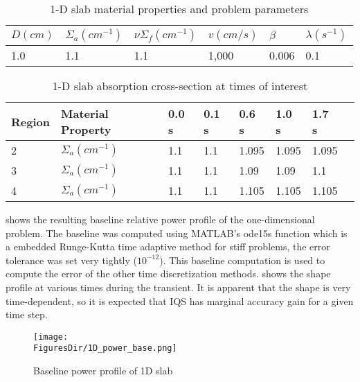 \begin{table}[!htbp]
\begin{center}
\caption{1-D slab material properties and problem parameters}
\label{tab:1Dmat}
\begin{tabular}{llllll}
\hline
$D (cm)$ & $\Sigma_a (cm^{-1})$ & $\nu \Sigma_f (cm^{-1})$ & $v (cm/s)$ & $\beta$ & $\lambda (s^{-1})$ \\
\hline
1.0 & 1.1 & 1.1 & 1,000 & 0.006 & 0.1 \\

\hline
\end{tabular}
\end{center}
\end{table}

\begin{table}[!htbp]
\begin{center}
\caption{1-D slab absorption cross-section at times of interest}
\label{tab:1Dslope}
\begin{tabular}{llllllll}
\hline
Region & Material Property & 0.0 s & 0.1 s & 0.6 s & 1.0 s & 1.7 s \\
\hline
2 & $\Sigma_{a} (cm^{-1})$ & 1.1 & 1.1 & 1.095 & 1.095 & 1.095 \\
3 & $\Sigma_{a} (cm^{-1})$ & 1.1 & 1.1 & 1.09 & 1.09 & 1.1 \\
4 & $\Sigma_{a} (cm^{-1})$ & 1.1 & 1.1 & 1.105 & 1.105 & 1.105 \\
\hline
\end{tabular}
\end{center}
\end{table}

 shows the resulting baseline relative power profile of the one-dimensional problem.  The baseline was computed using MATLAB's ode15s function which is a embedded Runge-Kutta time adaptive method for stiff problems, the error tolerance was set very tightly ($10^{-12}$).  This baseline computation is used to compute the error of the other time discretization methods.   shows the shape profile at various times during the transient.  It is apparent that the shape is very time-dependent, so it is expected that IQS has marginal accuracy gain for a given time step.

\begin{figure}[!htbp]
\begin{center}
\texttt{[image: \\FiguresDir/1D\_power\_base.png]}
\caption{Baseline power profile of 1D slab}
\label{fig:1D_power}
\end{center}
\end{figure}

